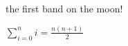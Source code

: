 \documentclass{article}
\begin{document}
t^^68e first band on the moon^^21

\newpage

$\sum_{i=0}^{n} i = \frac{n(n+1)}{2}$
\end{document}

